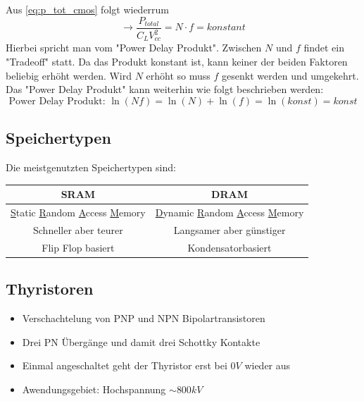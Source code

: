 \documentclass[12pt,a4paper]{report}%
\numberwithin{equation}{section}
\def\ul#1{\underline{#1}}
\numberwithin{equation}{subsection}
\begin{document}
  Aus \eqref{eq:p_tot_cmos} folgt wiederrum 
  \begin{equation}
    \rightarrow \frac{P_{total}}{C_L V_{cc}^2} = N \cdot f = konstant
  \end{equation}
  Hierbei spricht man vom "Power Delay Produkt". Zwischen $N$ und $f$ findet ein "Tradeoff" statt. Da das Produkt konstant ist, kann keiner der beiden Faktoren beliebig erhöht werden. Wird $N$ erhöht so muss $f$ gesenkt werden und umgekehrt. Das "Power Delay Produkt" kann weiterhin wie folgt beschrieben werden:
  \begin{equation}
    \text{Power Delay Produkt: } \ln (Nf) = \ln (N) + \ln (f) = \ln (konst) = konst
  \end{equation}
  
  \subsection{Speichertypen}
  Die meistgenutzten Speichertypen sind:
  \begin{table}[H]
    \centering
    \begin{tabular}{c | c}
    SRAM & DRAM \\ \hline
    \ul{S}tatic \ul{R}andom \ul{A}ccess \ul{M}emory & \ul{D}ynamic \ul{R}andom \ul{A}ccess \ul{M}emory \\
    Schneller aber teurer & Langsamer aber günstiger \\
    Flip Flop basiert & Kondensatorbasiert
    \end{tabular}
  \end{table}
  
  \subsection{Thyristoren}
  \begin{itemize}
    \item Verschachtelung von PNP und NPN Bipolartransistoren
    \item Drei PN Übergänge und damit drei Schottky Kontakte
    \item Einmal angeschaltet geht der Thyristor erst bei $0V$ wieder aus
    \item Awendungsgebiet: Hochspannung $\sim 800kV$
  \end{itemize}
\end{document}
